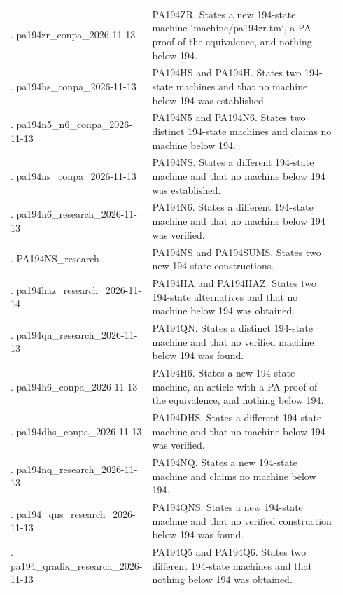 {\begin{longtable}{@{}>{\raggedright\arraybackslash}p{0.34\linewidth}>{\raggedright\arraybackslash}p{0.60\linewidth}@{}}
47. pa194zr\_\allowbreak{}conpa\_\allowbreak{}2026-11-13 & PA194ZR. States a new 194-state machine `machine/pa194zr.tm`, a PA proof of the equivalence, and nothing below 194.\\[5pt]
48. pa194hs\_\allowbreak{}conpa\_\allowbreak{}2026-11-13 & PA194HS and PA194H. States two 194-state machines and that no machine below 194 was established.\\[5pt]
49. pa194n5\_\allowbreak{}n6\_\allowbreak{}conpa\_\allowbreak{}2026-11-13 & PA194N5 and PA194N6. States two distinct 194-state machines and claims no machine below 194.\\[5pt]
50. pa194ns\_\allowbreak{}conpa\_\allowbreak{}2026-11-13 & PA194NS. States a different 194-state machine and that no machine below 194 was established.\\[5pt]
51. pa194n6\_\allowbreak{}research\_\allowbreak{}2026-11-13 & PA194N6. States a different 194-state machine and that no machine below 194 was verified.\\[5pt]
52. PA194NS\_\allowbreak{}research & PA194NS and PA194SUMS. States two new 194-state constructions.\\[5pt]
53. pa194haz\_\allowbreak{}research\_\allowbreak{}2026-11-14 & PA194HA and PA194HAZ. States two 194-state alternatives and that no machine below 194 was obtained.\\[5pt]
54. pa194qn\_\allowbreak{}research\_\allowbreak{}2026-11-13 & PA194QN. States a distinct 194-state machine and that no verified machine below 194 was found.\\[5pt]
55. pa194h6\_\allowbreak{}conpa\_\allowbreak{}2026-11-13 & PA194H6. States a new 194-state machine, an article with a PA proof of the equivalence, and nothing below 194.\\[5pt]
56. pa194dhs\_\allowbreak{}conpa\_\allowbreak{}2026-11-13 & PA194DHS. States a different 194-state machine and that no machine below 194 was verified.\\[5pt]
57. pa194nq\_\allowbreak{}research\_\allowbreak{}2026-11-13 & PA194NQ. States a new 194-state machine and claims no machine below 194.\\[5pt]
58. pa194\_\allowbreak{}qns\_\allowbreak{}research\_\allowbreak{}2026-11-13 & PA194QNS. States a new 194-state machine and that no verified construction below 194 was found.\\[5pt]
59. pa194\_\allowbreak{}qradix\_\allowbreak{}research\_\allowbreak{}2026-11-13 & PA194Q5 and PA194Q6. States two different 194-state machines and that nothing below 194 was obtained.\\[5pt]

\end{longtable}}
